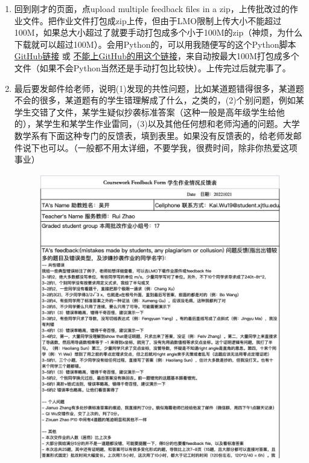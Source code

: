 \begin{enumerate}
\begin{figure}[H]
        \end{figure}
    \item 回到刚才的页面，点upload multiple feedback files in a zip，上传批改过的作业文件。把作业文件打包成zip上传，但由于LMO限制上传大小不能超过100M，如果总大小超过了就要手动打包成多个小于100M的zip（神烦，为什么下载就可以超过100M）。会用Python的，可以用我随便写的这个Python脚本 \href{https://github.com/kaiwu-astro/xp_pgrs_unofficial_guide/tree/main/fileshare/zip_in_100M.py}{GitHub链接} 或 \href{https://cowtransfer.com/s/8a91e9aa59ad4a}{不能上GitHub的用这个链接}，来自动按最大100M打包成多个文件（如果不会Python当然还是手动打包比较快）。上传完过后就完事了。
    \item 最后要发邮件给老师，说明(1)发现的共性问题，比如某道题错得很多，某道题不会的很多，某道题有的学生错理解成了什么，之类的，(2)个别问题，例如某学生交错了文件，某学生疑似抄袭标准答案（这种一般是高年级学生给他的），某学生和某学生作业雷同，(3)以及其他任何想和老师沟通的问题。大学数学系有下面这种专门的反馈表，填到表里。如果没有反馈表的，给老师发邮件说下也可以。（一般都不用太详细，不要学我，很费时间，除非你热爱这项事业）
        \begin{figure}[H]
            \centering
            \includegraphics[width=0.5\columnwidth]{author-folder/Kai.Wu/LMO_feedback_to_teacher.png}
        \end{figure}
\end{enumerate}


